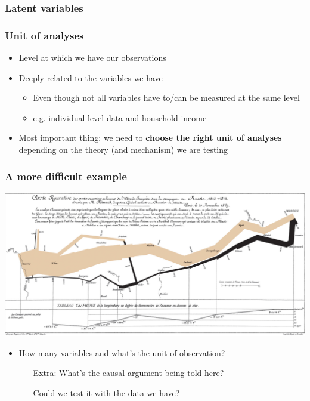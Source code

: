\documentclass[aspectratio=43]{beamer}
\begin{document}
\begin{frame}
\frametitle{Latent variables}
\centering

{\color{red}{EXAMPLE TWITTER LATENT IDEOLOGY}}

\end{frame}

\begin{frame}
\frametitle{Unit of analyses}
\centering

\begin{itemize}
  \item Level at which we have our observations
  \item Deeply related to the variables we have
  \begin{itemize}
    \item Even though not all variables have to/can be measured at the same level
    \item<2-> e.g. individual-level data and household income
  \end{itemize}
  \item<3-> Most important thing: we need to \textbf{choose the right unit of analyses} depending on the theory (and mechanism) we are testing
\end{itemize}


\end{frame}

\begin{frame}
\frametitle{A more difficult example}
\centering

\includegraphics[width = \textwidth]{../img/Minard}

\vspace{10pt}

\begin{itemize}\footnotesize
  \item How many variables and what's the unit of observation?
  \begin{itemize}
    \item[Extra:] What's the causal argument being told here?
    \item[] Could we test it with the data we have?
  \end{itemize}
\end{itemize}

\end{frame}
\end{document}
